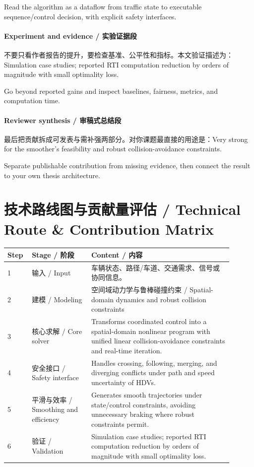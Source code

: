 \documentclass[UTF8,a4paper,11pt,fontset=fandol]{ctexart}
\begin{document}
Read the algorithm as a dataflow from traffic state to executable sequence/control decision, with explicit safety interfaces.

\paragraph{Experiment and evidence / 实验证据段}不要只看作者报告的提升，要检查基准、公平性和指标。本文验证描述为：Simulation case studies; reported RTI computation reduction by orders of magnitude with small optimality loss.

Go beyond reported gains and inspect baselines, fairness, metrics, and computation time.

\paragraph{Reviewer synthesis / 审稿式总结段}最后把贡献拆成可发表与需补强两部分。对你课题最直接的用途是：Very strong for the smoother's feasibility and robust collision-avoidance constraints.

Separate publishable contribution from missing evidence, then connect the result to your own thesis architecture.


\section{技术路线图与贡献量评估 / Technical Route \& Contribution Matrix}
\begin{longtable}{p{0.08\linewidth}p{0.24\linewidth}p{0.58\linewidth}}
\toprule
Step & Stage / 阶段 & Content / 内容\\
\midrule
1 & 输入 / Input & 车辆状态、路径/车道、交通需求、信号或协同信息。 \\
2 & 建模 / Modeling & 空间域动力学与鲁棒碰撞约束 / Spatial-domain dynamics and robust collision constraints \\
3 & 核心求解 / Core solver & Transforms coordinated control into a spatial-domain nonlinear program with unified linear collision-avoidance constraints and real-time iteration. \\
4 & 安全接口 / Safety interface & Handles crossing, following, merging, and diverging conflicts under path and speed uncertainty of HDVs. \\
5 & 平滑与效率 / Smoothing and efficiency & Generates smooth trajectories under state/control constraints, avoiding unnecessary braking where robust constraints permit. \\
6 & 验证 / Validation & Simulation case studies; reported RTI computation reduction by orders of magnitude with small optimality loss. \\
\bottomrule
\end{longtable}
\end{document}
